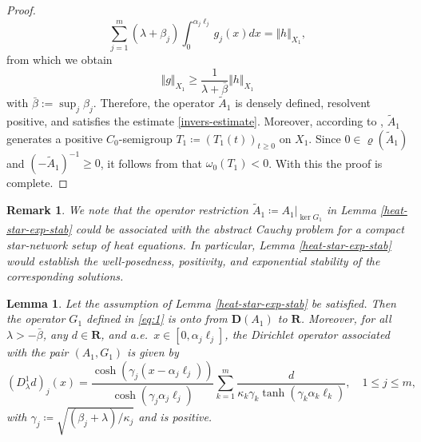 \documentclass[a4paper,11pt,reqno]{amsart}
\def\la{\lambda}
\def\R{\mathbf{R}}
\theoremstyle{plain}
\newtheorem{lemma}{Lemma}[section]
\newtheorem{remark}{Remark}[section]
\numberwithin{equation}{section}
\begin{document}
\begin{proof}
\begin{equation*}
\sum_{j=1}^{m}(\lambda+\beta_j)\int_{0}^{\alpha_j\ell_j} g_j(x)dx=\Vert h\Vert_{X_1}, 
\end{equation*}
from which we obtain
\begin{equation*}
\Vert g\Vert_{X_1}\ge \frac{1}{\lambda+\bar{\beta}}\Vert h\Vert_{X_1}
\end{equation*}
with $\bar{\beta}:=\sup_{j}\beta_j$. Therefore, the operator $\tilde{A}_1$ is densely defined, resolvent positive, and satisfies the estimate \eqref{invers-estimate}. Moreover, according to \cite[Theorem 2.5]{MR872810}, $\tilde{A}_1$ generates a positive $C_0$-semigroup $T_1\coloneqq (T_1(t))_{t\ge 0}$ on $X_1$. Since $0\in \varrho(\tilde{A}_1)$ and $(-\tilde{A}_1)^{-1}\ge 0$, it follows from \cite[Theorem C-IV.1.1 and Corollary C-IV.1.4]{MR839450} that $\omega_0(T_1)<0$. With this the proof is complete.
\end{proof}

\begin{remark}
We note that the operator restriction $\tilde{A}_1\coloneqq A_1\vert_{\ker G_1}$ in Lemma \ref{heat-star-exp-stab} could be associated with the abstract Cauchy problem for a compact star-network setup of heat equations. In particular, Lemma \ref{heat-star-exp-stab} would establish the well-posedness, positivity, and exponential stability of the corresponding solutions.
\end{remark}

\begin{lemma}\label{Dirichlet-heat-lemma}
Let the assumption of Lemma \ref{heat-star-exp-stab} be satisfied. Then the operator $G_1$ defined in \eqref{eq:1} is onto from ${\bm D}(A_1)$ to $\R$. Moreover, for all $\lambda>-\bar{\beta}$, any $d\in \R$, and a.e.\ $x\in [0,\alpha_j\ell_{j}]$, the Dirichlet operator associated with the pair $(A_1,G_1)$ is given by
\begin{equation}\label{Dirichlet-heat}
(D_\la^1 d)_j(x)= \frac{\cosh(\gamma_j (x-\alpha_j \ell_j))}{\cosh(\gamma_j \alpha_j \ell_j)}\sum_{k=1}^m \frac{d}{\kappa_k \gamma_k \tanh(\gamma_k \alpha_k \ell_k)},\quad 1 \le j\le m,
\end{equation}
with $\gamma_j\coloneqq\sqrt{{(\beta_j+\lambda)}/{\kappa_j}}$ and is positive.
\end{lemma}
\end{document}
